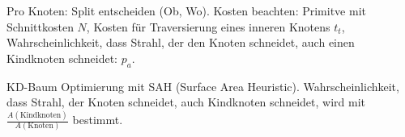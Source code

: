 \documentclass[12pt,landscape]{article}
\begin{document}
\begin{multicols}{3}
\begin{compactitem}
\item Pro Knoten: Split entscheiden (Ob, Wo). Kosten beachten: Primitve mit Schnittkosten $N$, Kosten für Traversierung eines inneren Knotens $t_t$, Wahrscheinlichkeit, dass Strahl, der den Knoten schneidet, auch einen Kindknoten schneidet: $p_a$. 
\item KD-Baum Optimierung mit SAH (Surface Area Heuristic). Wahrscheinlichkeit, dass Strahl, der Knoten schneidet, auch Kindknoten schneidet, wird mit $\frac{A(\text{Kindknoten})}{A(\text{Knoten})}$ bestimmt.
\end{compactitem}
\end{multicols}
\end{document}
